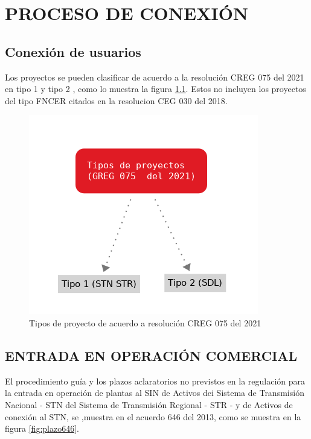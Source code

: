 \documentclass[a5paper]{book}%
\begin{document}
    
\chapter{PROCESO DE CONEXIÓN}

\section{Conexión de usuarios}

Los proyectos se pueden clasificar de acuerdo a la resolución CREG 075
del 2021 en tipo 1 y tipo 2 , como lo muestra la figura
\ref{fig:tipoproyecto}. Estos no incluyen los proyectos del tipo
\ac{FNCER} citados en la resolucion CEG 030 del 2018.


\begin{figure}[H]
  \centering \includegraphics[width=1\linewidth]{tipoproyecto}
  \caption{Tipos de proyecto de acuerdo a resolución CREG 075 del
    2021}
  \label{fig:tipoproyecto}
\end{figure}

    \section{ENTRADA EN OPERACIÓN COMERCIAL}

    El procedimiento guía y los plazos aclaratorios no previstos en la regulación para la entrada en operación de plantas al SIN de Activos dei Sistema de Transmisión Nacional - STN del Sistema de Transmisión Regional - STR - y de Activos de conexión al STN,  se ,muestra en el acuerdo 646 del 2013, como se muestra en la figura \ref{fig:plazo646}.
\end{document}
